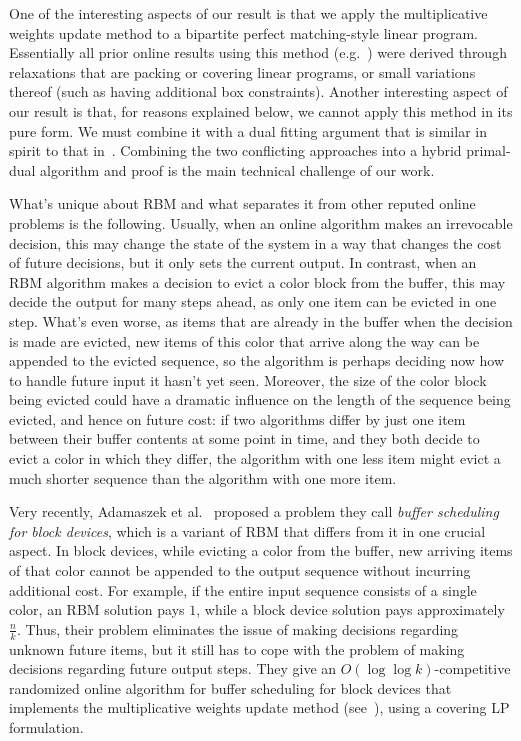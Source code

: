 \documentclass[12pt]{article}
\begin{document}
One of the interesting aspects of our result is that we apply the 
multiplicative weights update method to a bipartite perfect matching-style 
linear program. Essentially all prior online results 
using this method (e.g.~\cite{AAABN09,BBN12,BBMN11,ACER12}) 
were derived through relaxations that are packing 
or covering linear programs, or small variations thereof (such as 
having additional box constraints). Another interesting aspect of 
our result is that, for reasons explained below, we cannot apply this 
method in its pure form. We must combine it with a dual fitting argument 
that is similar in spirit to that in~\cite{AR10}. Combining the two
conflicting approaches into a hybrid primal-dual algorithm and
proof is the main technical challenge of our work.

What's unique about RBM and what separates it from other reputed
online problems is the following. Usually, when an online algorithm 
makes an irrevocable decision, this may change the state of the system
in a way that changes the cost of future decisions, but it only sets
the current output. In contrast, when an RBM algorithm makes a
decision to evict a color block from the buffer, this may decide the 
output for many steps ahead, as only one item can be evicted in one
step. What's even worse, as items that are already in the buffer when
the decision is made are evicted, new items of this color that arrive
along the way can be appended to the evicted sequence, so the algorithm
is perhaps deciding now how to handle future input it hasn't yet seen.
Moreover, the size of the color block being evicted could have a dramatic
influence on the length of the sequence being evicted, and hence on
future cost: if two algorithms differ by just one item between their buffer 
contents at some point in time, and they both decide to evict a color in 
which they differ, the algorithm with one less item might evict a much 
shorter sequence than the algorithm with one more item.

Very recently, Adamaszek et al.~\cite{ACER12} proposed a 
problem they call {\em buffer scheduling for block devices},
which is a variant of RBM that differs from it in one crucial
aspect. In block devices, while evicting a color from the buffer, 
new arriving items of that color cannot be appended to the 
output sequence without incurring additional cost. For example,
if the entire input sequence consists of a single color, an RBM 
solution pays $1$, while a block device solution pays 
approximately $\frac{n}{k}$. Thus, their problem eliminates 
the issue of making decisions regarding unknown future items, 
but it still has to cope with the problem of making decisions 
regarding future output steps. 
They give an $O(\log\log k)$-competitive
randomized online algorithm for buffer scheduling for
block devices that implements the multiplicative weights
update method (see~\cite{BN09}), using a covering LP formulation.
\end{document}
